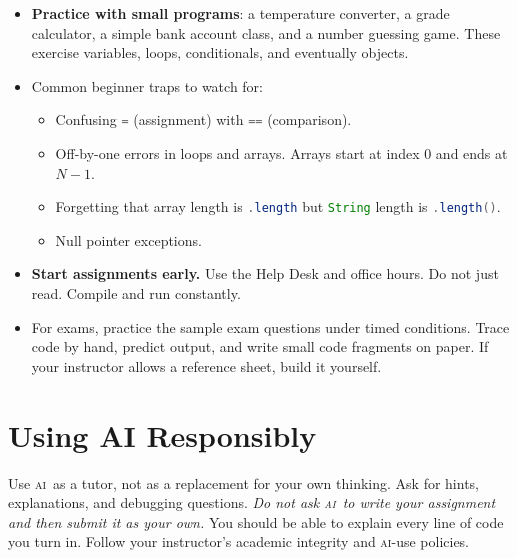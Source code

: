 \documentclass[%
 reprint,
 amsmath,amssymb,
 aps,
]{revtex4-2}
\newcommand{\AI}{\textsc{ai}}
\newcommand{\code}[1]{\lstinline[language=Java]{#1}}
\begin{document}
\begin{itemize}
	\item
	\textbf{Practice with small programs}: 
	a temperature converter, 
	a grade calculator, 
	a simple bank account class, and 
	a number guessing game. 
	These exercise variables, loops, conditionals, and eventually objects.
	
	\item
	Common beginner traps to watch for:
	
	\begin{itemize}
		
		\item 
		Confusing \code{=} (assignment) with \code{==} (comparison).
		
		\item 
		Off-by-one errors in loops and arrays. 
		Arrays start at index 0 and ends at $N - 1$.
		
		\item 
		Forgetting that array length is \code{.length} but 
		\code{String} length is \code{.length()}.
		
		\item 
		Null pointer exceptions.
	
		
	\end{itemize}

	\item
	\textbf{Start assignments early.} 
	Use the Help Desk and office hours. 
	Do not just read. Compile and run constantly.
	
	\item
	For exams, practice the sample exam questions under timed conditions. 
	Trace code by hand, predict output, and write small code fragments on paper. 
	If your instructor allows a reference sheet, build it yourself.

\end{itemize}




\section{Using AI Responsibly}

Use \AI\ as a tutor, not as a replacement for your own thinking. 
Ask for hints, explanations, and debugging questions. 
\emph{Do not ask \AI\ to write your assignment and then submit it as your own.} 
You should be able to explain every line of code you turn in. 
Follow your instructor’s academic integrity and \AI-use policies.




\end{document}
